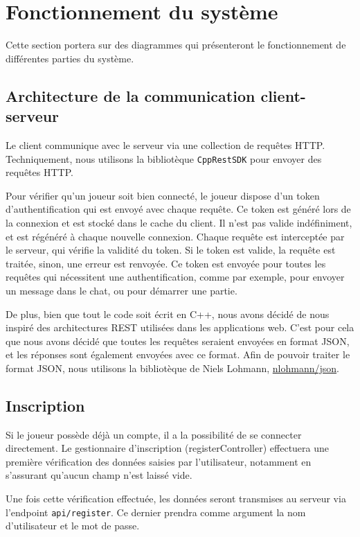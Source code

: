\documentclass[../design_fonctionnement_sys.tex]{subfiles}
\begin{document}
\section{Fonctionnement du système}
Cette section portera sur des diagrammes qui présenteront le fonctionnement de différentes parties du système.

\subsection{Architecture de la communication client-serveur}
Le client communique avec le serveur via une collection de requêtes HTTP. Techniquement, nous utilisons la bibliotèque \texttt{CppRestSDK} pour envoyer des requêtes HTTP.

Pour vérifier qu'un joueur soit bien connecté, le joueur dispose d'un token d'authentification qui est envoyé avec chaque requête.
Ce token est généré lors de la connexion et est stocké dans le cache du client. Il n'est pas valide indéfiniment, et est régénéré à chaque nouvelle connexion.
Chaque requête est interceptée par le serveur, qui vérifie la validité du token. Si le token est valide, la requête est traitée, sinon, une erreur est renvoyée.
Ce token est envoyée pour toutes les requêtes qui nécessitent une authentification, comme par exemple, pour envoyer un message dans le chat, ou pour démarrer une partie.

De plus, bien que tout le code soit écrit en C++, nous avons décidé de nous inspiré des architectures REST utilisées dans les applications web.
C'est pour cela que nous avons décidé que toutes les requêtes seraient envoyées en format JSON, et les réponses sont également envoyées avec ce format.
Afin de pouvoir traiter le format JSON, nous utilisons la bibliotèque de Niels Lohmann, \href{https://github.com/nlohmann/json}{nlohmann/json}.

\subsection{Inscription}
Si le joueur possède déjà un compte, il a la possibilité de se connecter directement.
Le gestionnaire d'inscription (registerController) effectuera une première vérification des données saisies par l'utilisateur, 
notamment en s'assurant qu'aucun champ n'est laissé vide.

Une fois cette vérification effectuée, les données seront transmises au serveur via l'endpoint \texttt{api/register}. Ce dernier prendra comme argument la nom d'utilisateur et le mot de passe.
\end{document}
